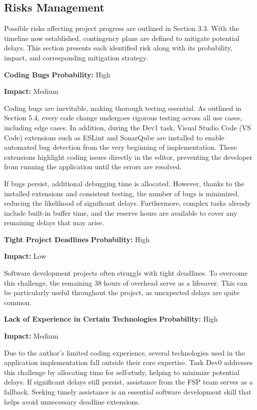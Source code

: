 \subsection{Risks Management}
Possible risks affecting project progress are outlined in Section 3.3. 
With the timeline now established, contingency plans are defined to 
mitigate potential delays. This section presents each identified risk 
along with its probability, impact, and corresponding mitigation strategy.

\noindent\textbf{Coding Bugs} \hfill \textbf{Probability:} High

\hfill \textbf{Impact:} Medium

Coding bugs are inevitable, making thorough testing essential. As 
outlined in Section 5.4, every code change undergoes rigorous testing 
across all use cases, including edge cases. In addition, during the 
Dev1 task, Visual Studio Code (VS Code) extensions such as ESLint and 
SonarQube are installed to enable automated bug detection from the very 
beginning of implementation. These extensions highlight coding issues 
directly in the editor, preventing the developer from running the 
application until the errors are resolved.

If bugs persist, additional debugging time is allocated. However, thanks 
to the installed extensions and consistent testing, the number of bugs 
is minimized, reducing the likelihood of significant delays. Furthermore, 
complex tasks already include built-in buffer time, and the reserve hours 
are available to cover any remaining delays that may arise.

\noindent\textbf{Tight Project Deadlines} \hfill \textbf{Probability:} High
 
\hfill \textbf{Impact:} Low

Software development projects often struggle with tight deadlines. To 
overcome this challenge, the remaining 38 hours of overhead serve as a 
lifesaver. This can be particularly useful throughout the project, as 
unexpected delays are quite common.

\noindent\textbf{Lack of Experience in Certain Technologies}  \hfill \textbf{Probability:} High
 
\hfill \textbf{Impact:} Medium

Due to the author's limited coding experience, several technologies used in the application implementation fall outside their core expertise. Task Dev0 addresses this challenge by allocating time for self-study, helping to minimize potential delays. If significant delays still persist, assistance from the FSP team serves as a fallback. Seeking timely assistance is an essential software development skill that helps avoid unnecessary deadline extensions.

